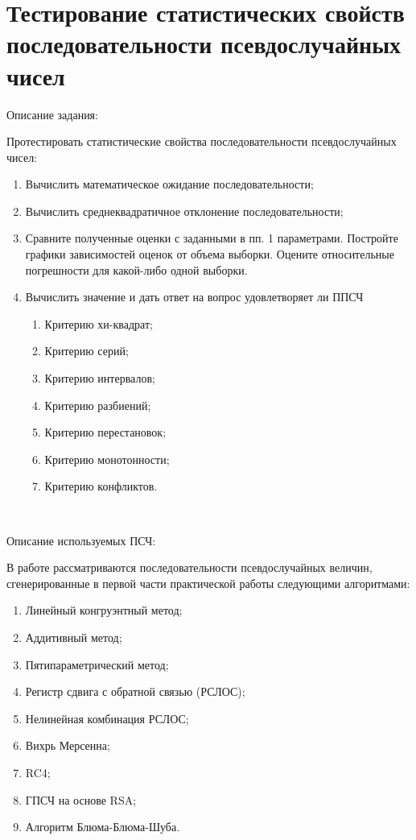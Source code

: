 \documentclass[bachelor, och, coursework]{shiza}
\begin{document}
	
	
		
	\section{Тестирование статистических свойств последовательности псевдослучайных чисел}
	
	Описание задания:
	
	Протестировать статистические свойства последовательности псевдослучайных чисел:
	\begin{enumerate}
		\item Вычислить математическое ожидание последовательности;
		\item Вычислить среднеквадратичное отклонение последовательности;
		\item Сравните полученные оценки с заданными в пп. 1 параметрами. Постройте графики зависимостей
		оценок от объема выборки. Оцените относительные погрешности для какой-либо одной выборки.
		\item Вычислить значение и дать ответ на вопрос удовлетворяет ли ППСЧ
		\begin{enumerate}
			\item Критерию хи-квадрат;
			\item Критерию серий;
			\item Критерию интервалов;
			\item Критерию разбиений;
			\item Критерию перестановок;
			\item Критерию монотонности;
			\item Критерию конфликтов.
		\end{enumerate}
	\end{enumerate} \

	Описание используемых ПСЧ:
	
	В работе рассматриваются последовательности псевдослучайных величин, сгенерированные в первой части практической работы следующими алгоритмами:
	\begin{enumerate}
		\item Линейный конгруэнтный метод;
		\item Аддитивный метод;
		\item Пятипараметрический метод;
		\item Регистр сдвига с обратной связью (РСЛОС);
		\item Нелинейная комбинация РСЛОС;
		\item Вихрь Мерсенна;
		\item RC4;
		\item ГПСЧ на основе RSA;
		\item Алгоритм Блюма-Блюма-Шуба.
	\end{enumerate}
\end{document}
